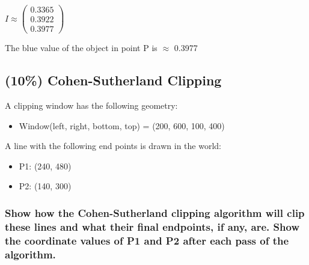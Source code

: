 $
    I
\approx
    \left(\begin{array}{c}
        0.3365\\
        0.3922\\
        0.3977
    \end{array}\right)
$

The blue value of the object in point P is $\approx$ 0.3977

\newpage
\subsection{ (10\%) Cohen-Sutherland Clipping }
A clipping window has the following geometry:
\begin{itemize}
    \item Window(left, right, bottom, top) = (200, 600, 100, 400) 
\end{itemize}
 
A line with the following end points is drawn in the world: 
\begin{itemize}
    \item P1: (240, 480) 
    \item P2: (140, 300) 
\end{itemize}
 
\subsubsection{Show how the Cohen-Sutherland clipping algorithm will clip these lines and what their final endpoints, if any, are.  Show the coordinate values of P1 and P2 after each pass of the algorithm.}